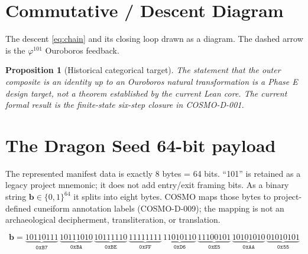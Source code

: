 \documentclass[11pt]{article}
\theoremstyle{definition}
\theoremstyle{plain}
\newtheorem{proposition}[definition]{Proposition}
\theoremstyle{remark}
\newcommand{\EEs}{\mathbf{E_8^{*}}}
\newcommand{\phigr}{\varphi}
\newcommand{\SiS}{\mathrm{SiS_2}}
\newcommand{\HPV}{\mathrm{HPV16}}
\newcommand{\DIAG}{\mathrm{DIAG}}
\newcommand{\TRI}{\mathrm{TRI^{*}ALITY}}
\newcommand{\Ouro}{\mathrm{Ouroboros}}
\begin{document}
\section{Commutative / Descent Diagram}\label{sec:diagram}
The descent \eqref{eq:chain} and its closing loop drawn as a diagram.
The dashed arrow is the $\phigr^{101}$ Ouroboros feedback.

\begin{center}
\end{center}

\begin{proposition}[Historical categorical target]
The statement that the outer composite is an identity up to an Ouroboros
natural transformation is a Phase E design target, not a theorem established
by the current Lean core. The current formal result is the finite-state
six-step closure in COSMO-D-001.
\end{proposition}

\section{The Dragon Seed 64-bit payload}
The represented manifest data is exactly 8 bytes = 64 bits. ``101'' is retained
as a legacy project mnemonic; it does not add entry/exit framing bits. As a
binary string $\bm{b}\in\{0,1\}^{64}$ it splits into eight bytes. COSMO maps
those bytes to project-defined cuneiform annotation labels (COSMO-D-009);
the mapping is not an archaeological decipherment, transliteration, or
translation.

\begin{equation*}
\bm{b} = \underbrace{10110111}_{\texttt{0xB7}}\,
         \underbrace{10111010}_{\texttt{0xBA}}\,
         \underbrace{10111110}_{\texttt{0xBE}}\,
         \underbrace{11111111}_{\texttt{0xFF}}\,
         \underbrace{11010110}_{\texttt{0xD6}}\,
         \underbrace{11100101}_{\texttt{0xE5}}\,
         \underbrace{10101010}_{\texttt{0xAA}}\,
         \underbrace{01010101}_{\texttt{0x55}}
\end{equation*}
\end{document}
